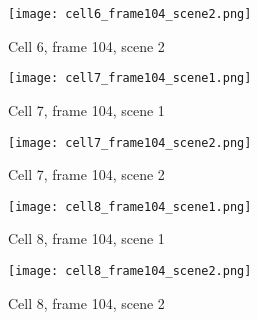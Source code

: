 \begin{figure}[H]
\centering
  \texttt{[image: cell6\_frame104\_scene2.png]}
  \caption{Cell 6, frame 104, scene 2}
  \label{img:cell6_frame104_scene2}
\end{figure}

\begin{figure}[H]
\centering
  \texttt{[image: cell7\_frame104\_scene1.png]}
  \caption{Cell 7, frame 104, scene 1}
  \label{img:cell7_frame104_scene1}
\end{figure}

\begin{figure}[H]
\centering
  \texttt{[image: cell7\_frame104\_scene2.png]}
  \caption{Cell 7, frame 104, scene 2}
  \label{img:cell7_frame104_scene2}
\end{figure}

\begin{figure}[H]
\centering
  \texttt{[image: cell8\_frame104\_scene1.png]}
  \caption{Cell 8, frame 104, scene 1}
  \label{img:cell8_frame104_scene1}
\end{figure}

\begin{figure}[H]
\centering
  \texttt{[image: cell8\_frame104\_scene2.png]}
  \caption{Cell 8, frame 104, scene 2}
  \label{img:cell8_frame104_scene2}
\end{figure}
